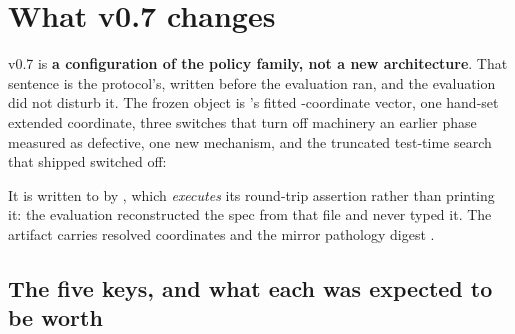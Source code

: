 \section{What v0.7 changes}
\label{sec:configuration}

v0.7 is \textbf{a configuration of the \vsix{} policy family, not a new architecture}. That sentence
is the protocol's, written before the evaluation ran, and the evaluation did not disturb it. The
frozen object is \vsix{}'s fitted \vsevenVsixCoords{}-coordinate vector, one hand-set extended coordinate, three
switches that turn off machinery an earlier phase measured as defective, one new mechanism, and the
truncated test-time search that \vsix{} shipped switched off:

\begin{quote}\small\ttfamily\raggedright
\vsevenFrozenSpecWrapped{}
\end{quote}

\noindent
It is written to  by ,
which \emph{executes} its round-trip assertion rather than printing it: the evaluation reconstructed
the spec from that file and never typed it. The artifact carries
\vsevenCoordinates{} resolved coordinates and the mirror pathology digest
\texttt{\vsevenMirrorDigest{}}.

\subsection{The five keys, and what each was expected to be worth}
\label{sec:configuration-keys}

